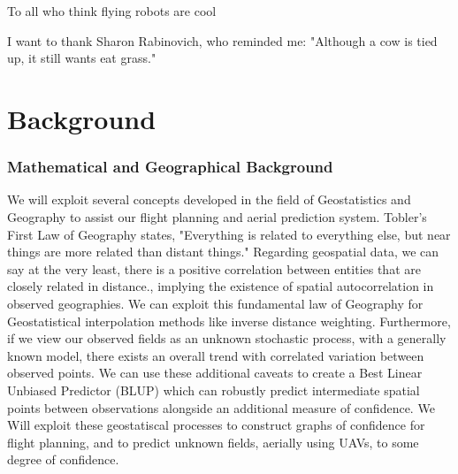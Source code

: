 \documentclass[11pt]{ucthesis}
\begin{document}
\begin{frontmatter}
\begin{dedication}
\null\vfil
{\large
\begin{center}
To all who think flying robots are cool
\vspace{12pt}
\end{center}}
\vfil\null
\end{dedication}


\begin{acknowledgements}
I want to thank Sharon Rabinovich, who reminded me: "Although a cow is tied up, it still wants eat grass."

\end{acknowledgements}

\end{frontmatter}

\part{Background}

\section{Mathematical and Geographical Background}
We will exploit several concepts developed in the field of Geostatistics and Geography to assist our flight planning and aerial prediction system. Tobler's First Law of Geography states, "Everything is related to everything else, but near things are more related than distant things."\cite{tobler:first_law} Regarding geospatial data, we can say at the very least, there is a positive correlation between entities that are closely related in distance.\cite{miller:on_toblers_first_law}, implying the existence of spatial autocorrelation in observed geographies. We can exploit this fundamental law of Geography for Geostatistical interpolation methods like inverse distance weighting. Furthermore, if we view our observed fields as an unknown stochastic process, with a generally known model, there exists an overall trend with correlated variation between observed points. We can use these additional caveats to create a Best Linear Unbiased Predictor (BLUP) which can robustly predict intermediate spatial points between observations alongside an additional measure of confidence. We Will exploit these geostatiscal processes to construct graphs of confidence for flight planning, and to predict unknown fields, aerially using UAVs, to some degree of confidence.
\end{document}
